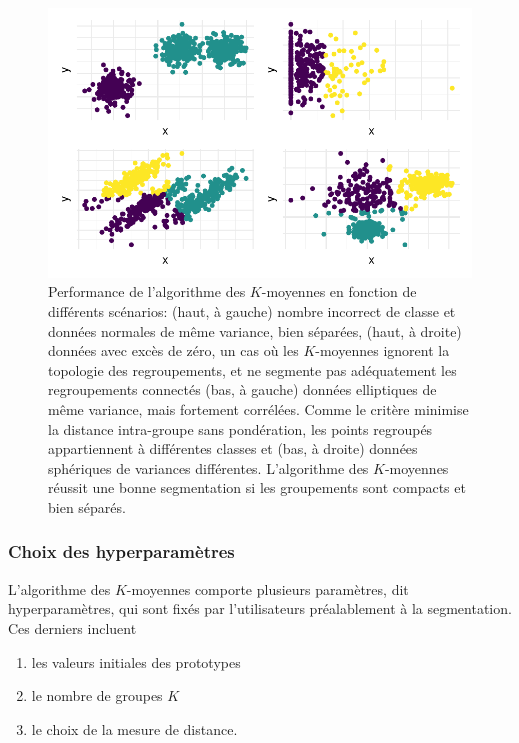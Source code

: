 \documentclass[
  11pt,
  letterpaper,
]{scrbook}
\providecommand{\tightlist}{%
  \setlength{\itemsep}{0pt}\setlength{\parskip}{0pt}}\usepackage{longtable,booktabs,array}
\theoremstyle{definition}
\theoremstyle{remark}
\begin{document}
\begin{figure}[ht!]

{\centering \includegraphics{regroupements_files/figure-pdf/kmoyperfo-1.pdf}

}

\caption{Performance de l'algorithme des \(K\)-moyennes en fonction de
différents scénarios: (haut, à gauche) nombre incorrect de classe et
données normales de même variance, bien séparées, (haut, à droite)
données avec excès de zéro, un cas où les \(K\)-moyennes ignorent la
topologie des regroupements, et ne segmente pas adéquatement les
regroupements connectés (bas, à gauche) données elliptiques de même
variance, mais fortement corrélées. Comme le critère minimise la
distance intra-groupe sans pondération, les points regroupés
appartiennent à différentes classes et (bas, à droite) données
sphériques de variances différentes. L'algorithme des \(K\)-moyennes
réussit une bonne segmentation si les groupements sont compacts et bien
séparés.}

\end{figure}

\hypertarget{choix-des-hyperparamuxe8tres}{%
\subsubsection*{Choix des
hyperparamètres}\label{choix-des-hyperparamuxe8tres}}

L'algorithme des \(K\)-moyennes comporte plusieurs paramètres, dit
hyperparamètres, qui sont fixés par l'utilisateurs préalablement à la
segmentation. Ces derniers incluent

\begin{enumerate}
\def\labelenumi{\arabic{enumi}.}
\tightlist
\item
  les valeurs initiales des prototypes
\item
  le nombre de groupes \(K\)
\item
  le choix de la mesure de distance.
\end{enumerate}
\end{document}
